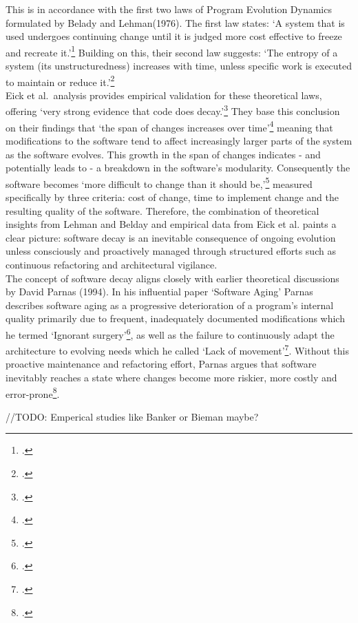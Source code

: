This is in accordance with the first two laws of Program Evolution Dynamics formulated by Belady and Lehman(1976).
The first law states: `A system that is used undergoes continuing change until it is judged more cost effective to freeze and recreate it.'\footcite[228]{beladyModelLargeProgram1976}
Building on this, their second law suggests: `The entropy of a system (its unstructuredness) increases with time, unless specific work is executed to maintain or reduce it.'\footcite[228]{beladyModelLargeProgram1976}\\

Eick et al.\ analysis provides empirical validation for these theoretical laws, offering `very strong evidence that code does decay.'\footcite[7]{eickDoesCodeDecay2001}
They base this conclusion on their findings that `the span of changes increases over time'\footcite[7]{eickDoesCodeDecay2001} meaning that modifications to the software tend to affect increasingly larger parts of the system as the software evolves. This growth in the span of changes indicates - and potentially leads to -
a breakdown in the software's modularity. Consequently the software becomes `more difficult to change than it should be,'\footcite[3]{eickDoesCodeDecay2001} measured specifically by three criteria: cost of change, time to implement change and the resulting quality of the software.
Therefore, the combination of theoretical insights from Lehman and Belday and empirical data from Eick et al. paints a clear picture: software decay is an inevitable consequence of ongoing evolution unless consciously and proactively managed through structured efforts such as continuous refactoring and architectural vigilance.\\

The concept of software decay aligns closely with earlier theoretical discussions by David Parnas (1994). In his influential paper `Software Aging' Parnas describes software aging as a progressive deterioration of a program's internal quality primarily due to frequent, 
inadequately documented modifications which he termed `Ignorant surgery'\footcite[280]{296790}, as well as the failure to continuously adapt the architecture to evolving needs which he called `Lack of movement'\footcite[280]{296790}.
Without this proactive maintenance and refactoring effort, Parnas argues that software inevitably reaches a state where changes become more riskier, more costly and error-prone\footcite[280-281]{296790}.

//TODO: Emperical studies like Banker or Bieman maybe?

